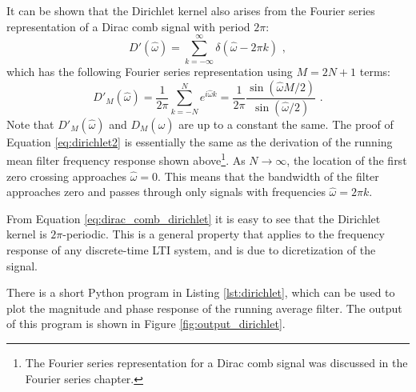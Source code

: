 It can be shown that the Dirichlet kernel also arises from the Fourier
series representation of a Dirac comb signal with period $2\pi$:
\begin{equation}
D'(\hat{\omega}) = \sum_{k=-\infty}^{\infty} \delta(\hat{\omega}-2\pi k) \,\,,
\label{eq:dirac_comb_dirichlet}
\end{equation}
which has the following Fourier series representation using $M=2N+1$ terms:
\begin{equation}
D'_M(\hat{\omega}) = \frac{1}{2\pi}\sum_{k=-N}^{N} e^{i \hat{\omega} k} = \frac{1}{2\pi}\frac{ \sin(\hat{\omega}M/2) }{\sin(\hat{\omega}/2)} \,\,.
\label{eq:dirichlet2}
\end{equation}
Note that $D'_M(\hat{\omega})$ and $D_M(\hat{\omega})$ are up to a
constant the same. The proof of Equation \ref{eq:dirichlet2} is
essentially the same as the derivation of the running mean filter
frequency response shown above\footnote{The Fourier series
representation for a Dirac comb signal was discussed in the Fourier
series chapter.}. As $N\rightarrow \infty$, the location of the first
zero crossing approaches $\hat{\omega}=0$. This means that the
bandwidth of the filter approaches zero and passes through only
signals with frequencies $\hat{\omega}=2\pi k$.

From Equation \ref{eq:dirac_comb_dirichlet} it is easy to see that the Dirichlet kernel is $2\pi$-periodic. This is a general property that
applies to the frequency response of any discrete-time LTI system,
and is due to dicretization of the signal.

There is a short Python program in Listing \ref{lst:dirichlet}, which
can be used to plot the magnitude and phase response of the running
average filter. The output of this program is shown in
Figure \ref{fig:output_dirichlet}.

